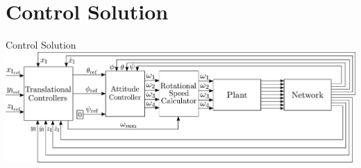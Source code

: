 \section{Control Solution}
\begin{frame}{Control Solution}{}
    \centering
    \includegraphics[scale=0.2]{figures/ControlDiagramPoster}
\end{frame}

